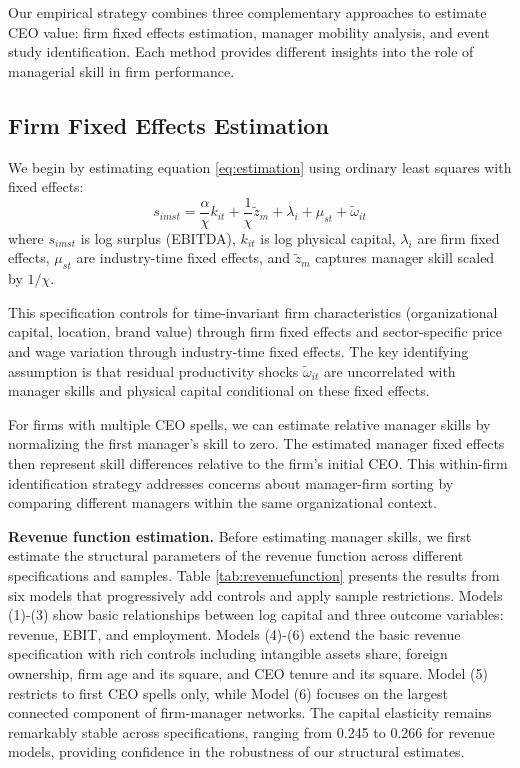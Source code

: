 \documentclass[11pt,a4paper]{article}
\begin{document}
Our empirical strategy combines three complementary approaches to estimate CEO value: firm fixed effects estimation, manager mobility analysis, and event study identification. Each method provides different insights into the role of managerial skill in firm performance.

\subsection{Firm Fixed Effects Estimation}

We begin by estimating equation \eqref{eq:estimation} using ordinary least squares with fixed effects:
\begin{equation}
s_{imst} = \frac{\alpha}{\chi} k_{it} + \frac{1}{\chi}\tilde{z}_m + \lambda_i + \mu_{st} + \tilde{\omega}_{it}
\end{equation}
where $s_{imst}$ is log surplus (EBITDA), $k_{it}$ is log physical capital, $\lambda_i$ are firm fixed effects, $\mu_{st}$ are industry-time fixed effects, and $\tilde{z}_m$ captures manager skill scaled by $1/\chi$.

This specification controls for time-invariant firm characteristics (organizational capital, location, brand value) through firm fixed effects and sector-specific price and wage variation through industry-time fixed effects. The key identifying assumption is that residual productivity shocks $\tilde{\omega}_{it}$ are uncorrelated with manager skills and physical capital conditional on these fixed effects.

For firms with multiple CEO spells, we can estimate relative manager skills by normalizing the first manager's skill to zero. The estimated manager fixed effects then represent skill differences relative to the firm's initial CEO. This within-firm identification strategy addresses concerns about manager-firm sorting by comparing different managers within the same organizational context.

\textbf{Revenue function estimation.} Before estimating manager skills, we first estimate the structural parameters of the revenue function across different specifications and samples. Table \ref{tab:revenuefunction} presents the results from six models that progressively add controls and apply sample restrictions. Models (1)-(3) show basic relationships between log capital and three outcome variables: revenue, EBIT, and employment. Models (4)-(6) extend the basic revenue specification with rich controls including intangible assets share, foreign ownership, firm age and its square, and CEO tenure and its square. Model (5) restricts to first CEO spells only, while Model (6) focuses on the largest connected component of firm-manager networks. The capital elasticity remains remarkably stable across specifications, ranging from 0.245 to 0.266 for revenue models, providing confidence in the robustness of our structural estimates.
\end{document}
